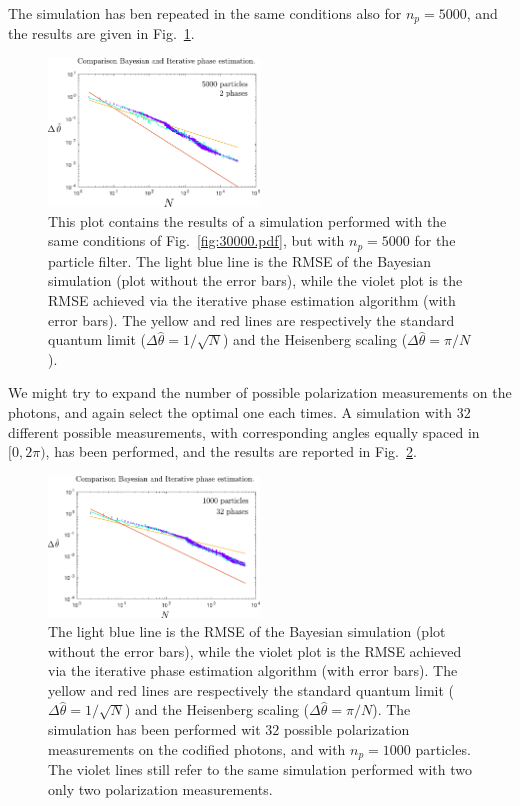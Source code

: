 \documentclass[aps, pra, 10pt, twocolumn, superscriptaddress,floatfix]{revtex4-1}
\begin{document}
%
The simulation has ben repeated in the same conditions also for $n_p = 5000$, and the results are given in Fig.~\ref{fig:30000part5000.pdf}.
%
\begin{figure}[!t]
	\begin{center}
		\includegraphics[width=0.5\textwidth]{immagini/30000part5000.pdf}
	\end{center}
	\caption{This plot contains the results of a simulation performed with the same conditions of Fig.~\ref{fig:30000.pdf}, but with $n_p = 5000$ for the particle filter. The light blue line is the RMSE of the Bayesian simulation (plot without the error bars), while the violet plot is the RMSE achieved via the iterative phase estimation algorithm (with error bars). The yellow and red lines are respectively the standard quantum limit ($\Delta \hat{\theta} = 1/\sqrt{N}$) and the Heisenberg scaling ($\Delta \hat{\theta} = \pi/N$).}
	\label{fig:30000part5000.pdf}
\end{figure}
%
We might try to expand the number of possible polarization measurements on the photons, and again select the optimal one each times. A simulation with $32$ different possible measurements, with corresponding angles equally spaced in $[0, 2 \pi)$, has been performed, and the results are reported in Fig.~\ref{fig:5800.pdf}.
%
\begin{figure}[!t]
	\begin{center}
		\includegraphics[width=0.5\textwidth]{immagini/5800.pdf}
	\end{center}
	\caption{The light blue line is the RMSE of the Bayesian simulation (plot without the error bars), while the violet plot is the RMSE achieved via the iterative phase estimation algorithm (with error bars). The yellow and red lines are respectively the standard quantum limit ($\Delta \hat{\theta} = 1/\sqrt{N}$) and the Heisenberg scaling ($\Delta \hat{\theta} = \pi/N$). The simulation has been performed wit $32$ possible polarization measurements on the codified photons, and with $n_p = 1000$ particles. The violet lines still refer to the same simulation performed with two only two polarization measurements.}
	\label{fig:5800.pdf}
\end{figure}
\end{document}
